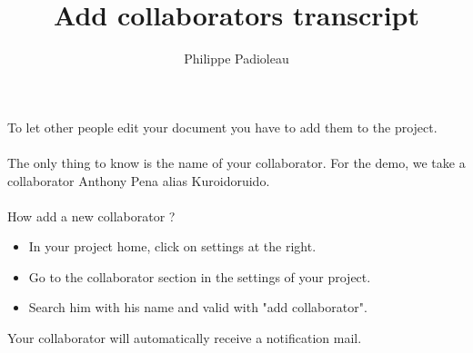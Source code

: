 \documentclass{article}
\title{Add collaborators transcript}
\author{Philippe Padioleau}
\date{}
\begin{document}
\maketitle

To let other people edit your document you have to add them to the project.
\\\\
The only thing to know is the name of your collaborator.
For the demo, we take a collaborator Anthony Pena alias Kuroidoruido.
\\\\
How add a new collaborator ? 
\begin{itemize}
\item In your project home, click on settings at the right.
\item Go to the collaborator section in the settings of your project.
\item Search him with his name and valid with "add collaborator".
\end{itemize}

Your collaborator will automatically receive a notification mail.
\end{document}
